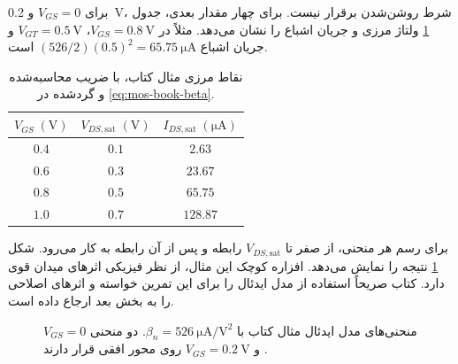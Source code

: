 برای \(V_{GS}=0\) و \qty{0.2}{\volt}، شرط روشن‌شدن برقرار نیست.
برای چهار مقدار بعدی، جدول \ref{tab:mos-book-points} ولتاژ مرزی و جریان اشباع
را نشان می‌دهد. مثلاً در \(V_{GS}=\qty{0.8}{\volt}\)،
\(V_{GT}=\qty{0.5}{\volt}\) و جریان اشباع
\((526/2)(0.5)^2=\qty{65.75}{\micro\ampere}\) است.
\begin{table}[ht]
\centering
\caption{نقاط مرزی مثال کتاب، با ضریب محاسبه‌شده و گرد‌شده در \eqref{eq:mos-book-beta}.}
\label{tab:mos-book-points}
\begin{tabular}{ccc}
\toprule
\(V_{GS}\;(\unit{\volt})\)&\(V_{DS,\mathrm{sat}}\;(\unit{\volt})\)&
\(I_{DS,\mathrm{sat}}\;(\unit{\micro\ampere})\)\\
\midrule
\(0.4\)&\(0.1\)&\(2.63\)\\
\(0.6\)&\(0.3\)&\(23.67\)\\
\(0.8\)&\(0.5\)&\(65.75\)\\
\(1.0\)&\(0.7\)&\(128.87\)\\
\bottomrule
\end{tabular}
\end{table}

برای رسم هر منحنی، از صفر تا \(V_{DS,\mathrm{sat}}\) رابطه  و پس از
آن رابطه  به کار می‌رود. شکل \ref{fig:mos-book-curves} نتیجه را
نمایش می‌دهد. افزاره کوچک این مثال، از نظر فیزیکی اثرهای میدان قوی دارد.
کتاب صریحاً استفاده از مدل ایدئال را برای این تمرین خواسته و اثرهای اصلاحی را
به بخش بعد ارجاع داده است.
\begin{figure}[ht]
\centering
\begin{latin}
\PersianMathDigits
{}
\end{latin}
\caption{منحنی‌های مدل ایدئال مثال  کتاب با
\(\beta_n=\qty{526}{\micro\ampere\per\volt\squared}\).
دو منحنی \(V_{GS}=0\) و \(V_{GS}=\qty{0.2}{\volt}\) روی محور افقی قرار دارند
\cite[شکل ]{weste}.}
\label{fig:mos-book-curves}
\end{figure}

